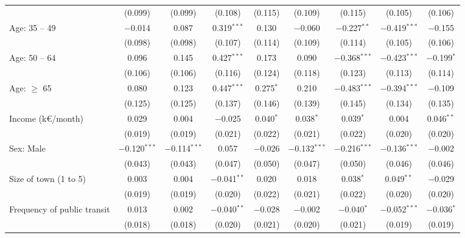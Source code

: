 \documentclass[11pt]{article}
\begin{document}
\begin{table}[!htbp]
{\begin{tabular}{@{\extracolsep{5pt}}lcccccccc}
  & (0.099) & (0.099) & (0.108) & (0.115) & (0.109) & (0.115) & (0.105) & (0.106) \\ 
  Age: 35 -- 49 & $-$0.014 & 0.087 & 0.319$^{***}$ & 0.130 & $-$0.060 & $-$0.227$^{**}$ & $-$0.419$^{***}$ & $-$0.155 \\ 
  & (0.098) & (0.098) & (0.107) & (0.114) & (0.109) & (0.114) & (0.105) & (0.106) \\ 
  Age: 50 -- 64 & 0.096 & 0.145 & 0.427$^{***}$ & 0.173 & 0.090 & $-$0.368$^{***}$ & $-$0.423$^{***}$ & $-$0.199$^{*}$ \\ 
  & (0.106) & (0.106) & (0.116) & (0.124) & (0.118) & (0.123) & (0.113) & (0.114) \\ 
  Age: $\geq$ 65 & 0.080 & 0.123 & 0.447$^{***}$ & 0.275$^{*}$ & 0.210 & $-$0.483$^{***}$ & $-$0.394$^{***}$ & $-$0.109 \\ 
  & (0.125) & (0.125) & (0.137) & (0.146) & (0.139) & (0.145) & (0.134) & (0.135) \\ 
  Income (k\euro{}/month) & 0.029 & 0.004 & $-$0.025 & 0.040$^{*}$ & 0.038$^{*}$ & 0.039$^{*}$ & 0.004 & 0.046$^{**}$ \\ 
  & (0.019) & (0.019) & (0.021) & (0.022) & (0.021) & (0.022) & (0.020) & (0.020) \\ 
  Sex: Male & $-$0.120$^{***}$ & $-$0.114$^{***}$ & 0.057 & $-$0.026 & $-$0.132$^{***}$ & $-$0.216$^{***}$ & $-$0.136$^{***}$ & $-$0.002 \\ 
  & (0.043) & (0.043) & (0.047) & (0.050) & (0.047) & (0.050) & (0.046) & (0.046) \\ 
  Size of town (1 to 5) & 0.003 & 0.004 & $-$0.041$^{**}$ & 0.020 & 0.018 & 0.038$^{*}$ & 0.049$^{**}$ & $-$0.029 \\ 
  & (0.019) & (0.019) & (0.020) & (0.022) & (0.021) & (0.022) & (0.020) & (0.020) \\ 
  Frequency of public transit & 0.013 & 0.002 & $-$0.040$^{**}$ & $-$0.028 & $-$0.002 & $-$0.040$^{*}$ & $-$0.052$^{***}$ & $-$0.036$^{*}$ \\ 
  & (0.018) & (0.018) & (0.020) & (0.021) & (0.020) & (0.021) & (0.019) & (0.019) \\ 


\end{tabular}}
\end{table}
\end{document}
